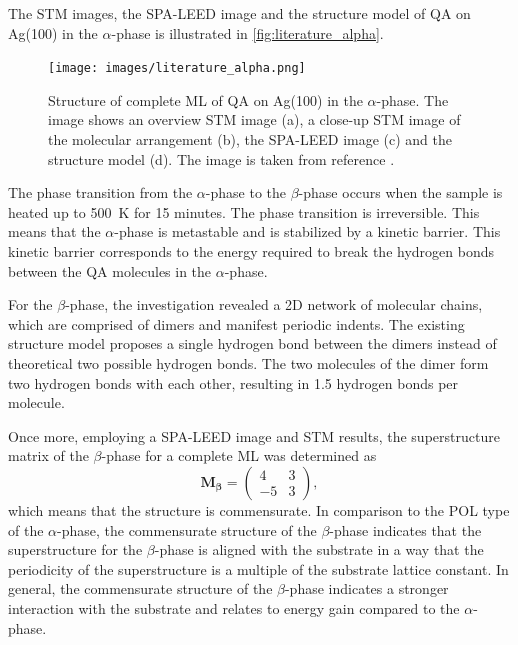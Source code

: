 The \ac{STM} images, the \ac{SPA-LEED} image and the structure model of \ac{QA} on Ag(100) in the $\alpha$-phase is illustrated in \autoref{fig:literature_alpha}.
\begin{figure}[htb]
	\centering
	\texttt{[image: images/literature\_alpha.png]}
	\caption{Structure of complete \ac{ML} of \ac{QA} on Ag(100) in the $\alpha$-phase. The image shows an overview \ac{STM} image (a), a close-up \ac{STM} image of the molecular arrangement (b), the \ac{SPA-LEED} image (c) and the structure model (d). The image is taken from reference \cite{Humberg2024}.}
	\label{fig:literature_alpha}
\end{figure}
The phase transition from the $\alpha$-phase to the $\beta$-phase occurs when the sample is heated up to 500~\si{K} for 15 minutes. The phase transition is irreversible. This means that the $\alpha$-phase is metastable and is stabilized by a kinetic barrier. This kinetic barrier corresponds to the energy required to break the hydrogen bonds between the \ac{QA} molecules in the $\alpha$-phase.

For the $\beta$-phase, the investigation revealed a 2D network of molecular chains, which are comprised of dimers and manifest periodic indents. The existing structure model proposes a single hydrogen bond between the dimers instead of theoretical two possible hydrogen bonds. The two molecules of the dimer form two hydrogen bonds with each other, resulting in 1.5 hydrogen bonds per molecule.

Once more, employing a \ac{SPA-LEED} image and \ac{STM} results, the superstructure matrix of the $\beta$-phase for a complete \ac{ML} was determined as
\begin{equation*}
\mathbf{M_\beta} =\begin{pmatrix}
4 & 3 \\
-5 & 3 
\end{pmatrix},
\end{equation*}
which means that the structure is commensurate. In comparison to the \ac{POL} type of the $\alpha$-phase, the commensurate structure of the $\beta$-phase indicates that the superstructure for the $\beta$-phase is aligned with the substrate in a way that the periodicity of the superstructure is a multiple of the substrate lattice constant. In general, the commensurate structure of the $\beta$-phase indicates a stronger interaction with the substrate and relates to energy gain compared to the $\alpha$-phase.\autocite{Hooks2001}

